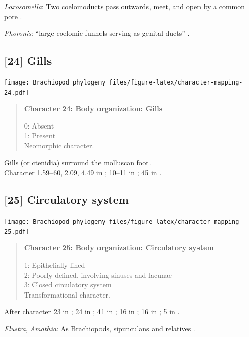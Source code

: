 \documentclass[openany]{book}
\begin{document}
\hypertarget{Loxosomella-coding-23}{}
\emph{Loxosomella}: Two coelomoducts pass outwards, meet, and open by a
common pore \citep{Goodrich1945}.

\hypertarget{Phoronis-coding-23}{}
\emph{Phoronis}: ``large coelomic funnels serving as genital ducts''
\citep{Goodrich1945}.

\subsection*{{[}24{]} Gills}\label{gills}

\texttt{[image: Brachiopod\_phylogeny\_files/figure-latex/character-mapping-24.pdf]}

\begin{quote}
\textbf{Character 24: Body organization: Gills}

0: Absent\\
1: Present\\
Neomorphic character.
\end{quote}

Gills (or ctenidia) surround the molluscan foot.\\
Character 1.59--60, 2.09, 4.49 in \citet{SPS1996}; 10--11 in
\citet{Haszprunar2000}; 45 in \citet{Sutton2012}.

\subsection*{{[}25{]} Circulatory system}\label{circulatory-system}

\texttt{[image: Brachiopod\_phylogeny\_files/figure-latex/character-mapping-25.pdf]}

\begin{quote}
\textbf{Character 25: Body organization: Circulatory system}

1: Epithelially lined\\
2: Poorly defined, involving sinuses and lacunae\\
3: Closed circulatory system\\
Transformational character.
\end{quote}

After character 23 in \citet{Haszprunar1996}; 24 in
\citet{Haszprunar2000}; 41 in \citet{Rouse1999}; 16 in
\citet{Scheltema1993}; 16 in \citet{Vinther2008}; 5 in
\citet{Haszprunar2008}.

\hypertarget{Amathia-coding-25}{}
\emph{Flustra}, \emph{Amathia}: As Brachiopods, sipunculans and
relatives \citep{Ruppert1983}.
\end{document}
